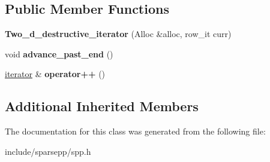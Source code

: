 \subsection*{Public Member Functions}
\begin{DoxyCompactItemize}
\item 
{\bfseries Two\+\_\+d\+\_\+destructive\+\_\+iterator} (Alloc \&alloc, row\+\_\+it curr)\hypertarget{classspp___1_1_two__d__destructive__iterator_a472cd041ed5afa9462a4ad2476924ece}{}\label{classspp___1_1_two__d__destructive__iterator_a472cd041ed5afa9462a4ad2476924ece}

\item 
void {\bfseries advance\+\_\+past\+\_\+end} ()\hypertarget{classspp___1_1_two__d__destructive__iterator_a2d0eddeed1016a822d6f29f701913483}{}\label{classspp___1_1_two__d__destructive__iterator_a2d0eddeed1016a822d6f29f701913483}

\item 
\hyperlink{classspp___1_1_two__d__iterator}{iterator} \& {\bfseries operator++} ()\hypertarget{classspp___1_1_two__d__destructive__iterator_a149413eaecc8ec5d1b4fd645092cd84e}{}\label{classspp___1_1_two__d__destructive__iterator_a149413eaecc8ec5d1b4fd645092cd84e}

\end{DoxyCompactItemize}
\subsection*{Additional Inherited Members}


The documentation for this class was generated from the following file\+:\begin{DoxyCompactItemize}
\item 
include/sparsepp/spp.\+h\end{DoxyCompactItemize}
